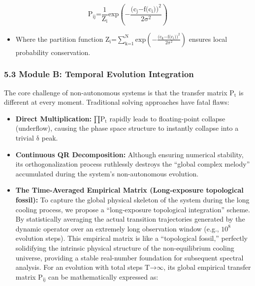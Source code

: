 \[\text{P}_{\text{ij}}\text{=}\frac{\text{1}}{\text{Z}_{\text{i}}}\text{exp}\left( \text{−}\frac{\text{(}\text{c}_{\text{j}}\text{−}\text{f}\text{(}\text{c}_{\text{i}}\text{)}\text{)}^{\text{2}}}{\text{2}\text{σ}^{\text{2}}} \right)\]

\begin{itemize}
\item
  Where the partition function
  \(\text{Z}_{\text{i}}\text{=}\sum_{\text{k}\text{=1}}^{\text{N}}\text{exp}\left( \text{−}\frac{\text{(}\text{c}_{\text{k}}\text{−}\text{f}\text{(}\text{c}_{\text{i}}\text{)}\text{)}^{\text{2}}}{\text{2}\text{σ}^{\text{2}}} \right)\)
  ensures local probability conservation.
\end{itemize}

\hypertarget{module-b-temporal-evolution-integration}{%
\subsubsection{\texorpdfstring{\textbf{5.3 Module B: Temporal Evolution
Integration}}{5.3 Module B: Temporal Evolution Integration}}\label{module-b-temporal-evolution-integration}}

The core challenge of non-autonomous systems is that the transfer matrix
\(\text{P}_{\text{t}}\) is different at every moment. Traditional
solving approaches have fatal flaws:

\begin{itemize}
\item
  \textbf{Direct Multiplication:} \(\text{∏}\text{P}_{\text{t}}\)
  rapidly leads to floating-point collapse (underflow), causing the
  phase space structure to instantly collapse into a trivial
  \(\text{δ}\) peak.
\item
  \textbf{Continuous QR Decomposition:} Although ensuring numerical
  stability, its orthogonalization process ruthlessly destroys the
  ``global complex melody'' accumulated during the system's
  non-autonomous evolution.
\item
  \textbf{The Time-Averaged Empirical Matrix (Long-exposure topological
  fossil):} To capture the global physical skeleton of the system during
  the long cooling process, we propose a ``long-exposure topological
  integration'' scheme. By statistically averaging the actual transition
  trajectories generated by the dynamic operator over an extremely long
  observation window (e.g., \(\text{10}^{\text{8}}\) evolution steps).
  This empirical matrix is like a ``topological fossil,'' perfectly
  solidifying the intrinsic physical structure of the non-equilibrium
  cooling universe, providing a stable real-number foundation for
  subsequent spectral analysis. For an evolution with total steps
  \(\text{T}\text{→∞}\), its global empirical transfer matrix
  \(\text{P}_{\text{ij}}\) can be mathematically expressed as:
\end{itemize}

